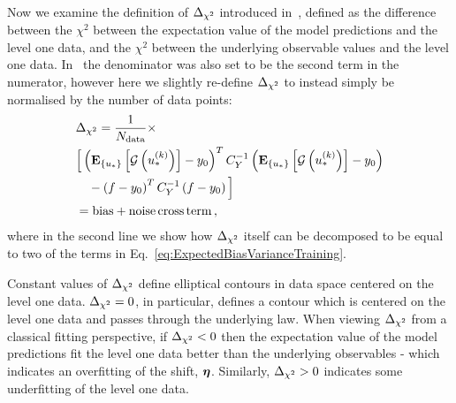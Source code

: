 Now we examine the definition of $\Delta_{\chi^2}$ introduced
in~\cite{nnpdf30}, defined as the difference between the
$\chi^2$ between the expectation value of the model predictions and the level
one data, and the $\chi^2$ between the underlying observable values and the
level one data. In~\cite{nnpdf30} the denominator was also set to be the
second term in the numerator, however here we slightly re-define
$\Delta_{\chi^2}$ to instead simply be normalised by the number of data points:
\begin{equation}\label{eq:deltachi2def1}
    \begin{split}
        &\Delta_{\chi^2} = 
            \frac{1}{N_{\rm data}}\times \\ 
            & \Big[ \left( \mathbf{E}_{\{ u_* \}} \left[ \mathcal{G}\left(u_*^{(k)}\right) \right] - y_0 \right)^T
            C_{Y}^{-1}
            \left( \mathbf{E}_{\{ u_* \}} \left[ \mathcal{G}\left(u_*^{(k)}\right) \right] - y_0 \right) \\
            & \quad - \left( f - y_0 \right)^T
            C_{Y}^{-1}
            \left( f - y_0 \right)
        \Big] \\
        &= {\rm bias} + {\rm noise \, cross \, term} \, ,
    \end{split}
\end{equation}
where in the second line we show how $\Delta_{\chi^2}$ itself can be decomposed to
be equal to two of the terms in Eq.~\ref{eq:ExpectedBiasVarianceTraining}.

Constant values of $\Delta_{\chi^2}$ define elliptical contours in data space
centered on the level one data. $\Delta_{\chi^2} = 0$, in particular, defines a
contour which is centered on the level one data and passes through the
underlying law. When viewing $\Delta_{\chi^2}$ from a classical fitting perspective,
if $\Delta_{\chi^2} < 0$ then the expectation value of the model
predictions fit the level one data better than the underlying observables -
which indicates an overfitting of the shift, $\boldsymbol{\eta}$. Similarly,
$\Delta_{\chi^2} > 0$ indicates some underfitting of the level one data.

